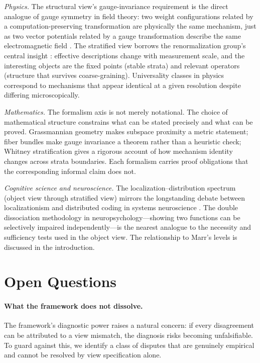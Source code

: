 \documentclass{article}
\begin{document}
\emph{Physics.}
The structural view's gauge-invariance requirement is the direct
analogue of gauge symmetry in field theory: two weight configurations
related by a computation-preserving transformation are physically
the same mechanism, just as two vector potentials related by a gauge
transformation describe the same electromagnetic field
\citep{nakahara2003}.  The stratified view borrows the renormalization
group's central insight \citep{wilson1971,goldenfeld1992}: effective
descriptions change with measurement scale, and the interesting
objects are the fixed points (stable strata) and relevant operators
(structure that survives coarse-graining).  Universality classes
in physics correspond to mechanisms that appear identical at a given
resolution despite differing microscopically.

\emph{Mathematics.}
The formalism axis is not merely notational.  The choice of
mathematical structure constrains what can be stated precisely and
what can be proved.  Grassmannian geometry \citep{nakahara2003}
makes subspace proximity a metric statement; fiber bundles make
gauge invariance a theorem rather than a heuristic check; Whitney
stratification \citep{whitney1965,golubitsky1973} gives a rigorous
account of how mechanism identity changes across strata boundaries.
Each formalism carries proof obligations that the corresponding
informal claim does not.

\emph{Cognitive science and neuroscience.}
The localization--distribution spectrum (object view through stratified
view) mirrors the longstanding debate between localizationism and
distributed coding in systems neuroscience
\citep{bechtel1993}.  The double dissociation methodology in
neuropsychology---showing two functions can be selectively impaired
independently---is the nearest analogue to the necessity and
sufficiency tests used in the object view.  The relationship to Marr's levels is discussed in the introduction.

\section{Open Questions}\label{sec:open}

\paragraph{What the framework does not dissolve.}
The framework's diagnostic power raises a natural concern: if every disagreement can be attributed to a view mismatch, the diagnosis risks becoming unfalsifiable.  To guard against this, we identify a class of disputes that are genuinely empirical and cannot be resolved by view specification alone.
\end{document}
